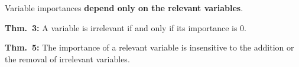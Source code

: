 \documentclass[final]{beamer}
\newcommand{\cmark}{\ding{51}}%
\begin{document}
\begin{frame}

\vspace{-1.5cm}

{\color{green} \cmark} Variable importances \textbf{depend only on the relevant variables}.

\vspace{1cm}

\textbf{Thm.~3:} A variable is irrelevant if and only if its importance is 0.

\vspace{1cm}

\textbf{Thm.~5:} The importance of a relevant variable is insensitive to the addition or the removal of irrelevant variables.

\end{frame}
\end{document}

